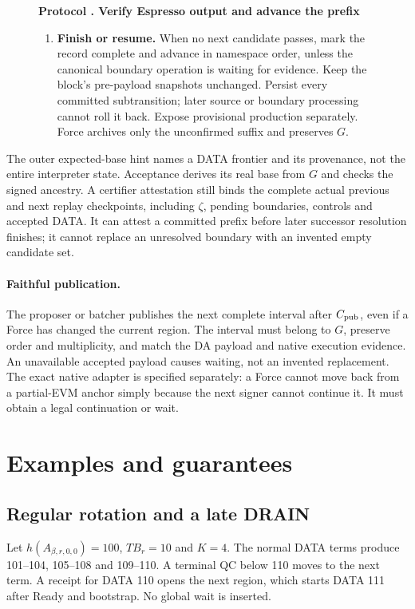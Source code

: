 \documentclass[11pt,a4paper]{article}
\newcommand{\TB}{\mathit{TB}}
\newcounter{protocol}
\newenvironment{protocol}[3][htbp]{\begin{figure}[#1]\refstepcounter{protocol}\label{#2}
\begin{mdframed}[linewidth=.6pt,skipabove=0pt,skipbelow=0pt,
innertopmargin=7pt,innerbottommargin=7pt]\small
\textbf{Protocol \theprotocol. #3}\par\smallskip}{\end{mdframed}\end{figure}}
\begin{document}
\begin{protocol}{alg:external}{Verify Espresso output and advance the prefix}
\begin{enumerate}[label=\textbf{\arabic*)},itemsep=3pt]
\item \textbf{Finish or resume.} When no next candidate passes, mark
the record complete and advance in namespace order, unless the canonical
boundary operation is waiting for evidence. Keep the block's pre-payload
snapshots unchanged. Persist every committed subtransition; later source
or boundary processing cannot roll it back. Expose provisional production
separately. Force archives only the unconfirmed suffix and preserves $G$.
\end{enumerate}
\end{protocol}

The outer expected-base hint names a DATA frontier and its provenance,
not the entire interpreter state. Acceptance derives its real base from
$G$ and checks the signed ancestry. A certifier attestation still binds
the complete actual previous and next replay checkpoints, including
$\zeta$, pending boundaries, controls and accepted DATA. It can attest a
committed prefix before later successor resolution finishes; it cannot
replace an unresolved boundary with an invented empty candidate set.



\paragraph{Faithful publication.}
The proposer or batcher publishes the next complete interval after
$C_{\rm pub}$, even if a Force has changed the current region.
The interval must belong to $G$, preserve order and multiplicity, and
match the DA payload and native execution evidence. An unavailable
accepted payload causes waiting, not an invented replacement.
The exact native adapter is specified separately: a Force cannot move
back from a partial-EVM anchor simply because the next signer cannot
continue it. It must obtain a legal continuation or wait.

\section{Examples and guarantees}
\label{sec:examples}
\subsection{Regular rotation and a late DRAIN}
\label{sec:regular-example}
Let $h(A_{\beta,r,0,0})=100$, $\TB_r=10$ and $K=4$. The normal DATA terms
produce 101--104, 105--108 and 109--110. A terminal QC below 110 moves
to the next term. A receipt for DATA 110 opens the next region, which
starts DATA 111 after Ready and bootstrap. No global wait is inserted.
\end{document}
